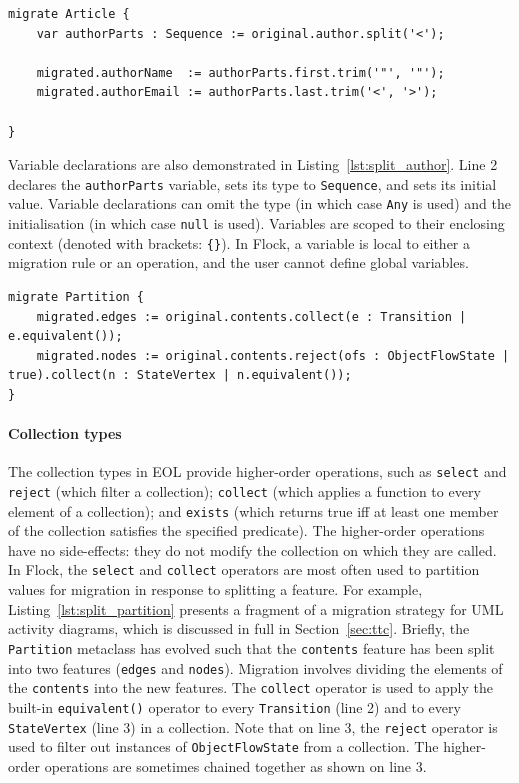 \begin{lstlisting}[caption=Using primitive and collection values,  label=lst:split_author, language=Flock, float=tb]
migrate Article {
	var authorParts : Sequence := original.author.split('<');
	
	migrated.authorName  := authorParts.first.trim('"', '"');
	migrated.authorEmail := authorParts.last.trim('<', '>');
	
}
\end{lstlisting}

Variable declarations are also demonstrated in Listing~\ref{lst:split_author}. Line 2 declares the \texttt{au\-th\-orPa\-r\-ts} variable, sets its type to \texttt{Se\-qu\-en\-ce}, and sets its initial value. Variable declarations can omit the type (in which case \texttt{Any} is used) and the initialisation (in which case \texttt{nu\-ll} is used). Variables are scoped to their enclosing context (denoted with brackets: \texttt{\{\}}). In Flock, a variable is local to either a migration rule or an operation, and the user cannot define global variables.

\begin{lstlisting}[caption=Using higher-order operations on collections,  label=lst:split_partition, language=Flock, float=tb]
migrate Partition {
	migrated.edges := original.contents.collect(e : Transition | e.equivalent());
	migrated.nodes := original.contents.reject(ofs : ObjectFlowState | true).collect(n : StateVertex | n.equivalent());	
}
\end{lstlisting}

\paragraph{Collection types} The collection types in EOL provide higher-order operations, such as \texttt{se\-le\-ct} and \texttt{re\-je\-ct} (which filter a collection); \texttt{co\-ll\-e\-ct} (which applies a function to every element of a collection); and \texttt{ex\-is\-ts} (which returns true iff at least one member of the collection satisfies the specified predicate). The higher-order operations have no side-effects: they do not modify the collection on which they are called. In Flock, the \texttt{select} and \texttt{collect} operators are most often used to partition values for migration in response to splitting a feature. For example, Listing~\ref{lst:split_partition} presents a fragment of a migration strategy for UML activity diagrams, which is discussed in full in Section~\ref{sec:ttc}. Briefly, the \texttt{Partition} metaclass has evolved such that the \texttt{contents} feature has been split into two features (\texttt{edges} and \texttt{nodes}). Migration involves dividing the elements of the \texttt{contents} into the new features. The \texttt{co\-ll\-e\-ct} operator is used to apply the built-in \texttt{eq\-ui\-va\-le\-nt()} operator to every \texttt{Tr\-an\-si\-ti\-on} (line 2) and to every \texttt{St\-a\-teVe\-rt\-ex}  (line 3) in a collection. Note that on line 3, the \texttt{re\-je\-ct} operator is used to filter out instances of \texttt{Ob\-je\-ctFl\-owSt\-a\-te} from a collection. The higher-order operations are sometimes chained together as shown on line 3.


